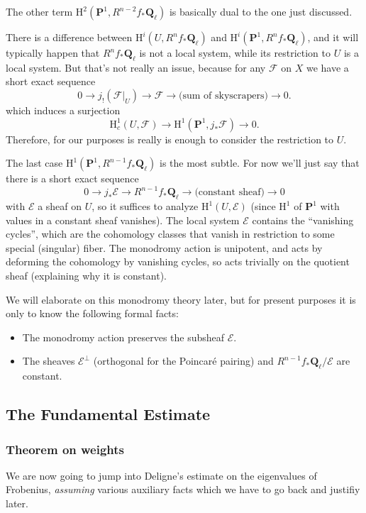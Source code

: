 \documentclass[letterpaper,11pt]{article}
\newcommand{\Q}{\mathbf{Q}}
\newcommand{\PS}{\mathbf{P}}
\newcommand{\Cal}[1]{\mathcal{#1}}
\newcommand{\mrm}[1]{\mathrm{#1}}
\begin{document}
The other term $\mrm{H}^2(\PS^1, R^{n-2} f_* \Q_{\ell})$ is basically dual to the one just discussed. 

\begin{remark}
There is a difference between $\mrm{H}^i(U, R^n f_* \Q_{\ell})$ and $\mrm{H}^i(\PS^1 ,R^n f_* \Q_{\ell})$, and it will typically happen that $R^n f_* \Q_{\ell}$ is not a local system, while its restriction to $U$ is a local system. But that's not really an issue, because for any $\Cal{F}$ on $X$ we have a short exact sequence 
\[
0 \rightarrow j_! (\Cal{F}|_U)  \rightarrow \Cal{F} \rightarrow \text{(sum of skyscrapers)} \rightarrow 0.
\]
which induces a surjection 
\[
\mrm{H}_c^1(U, \Cal{F}) \rightarrow \mrm{H}^1(\PS^1, j_* \Cal{F}) \rightarrow 0.
\]
Therefore, for our purposes is really is enough to consider the restriction to $U$. 
\end{remark}

The last case $\mrm{H}^1(\PS^1, R^{n-1} f_* \Q_{\ell})$ is the most subtle. For now we'll just say that there is a short exact sequence 
\begin{equation}\label{vanishing_sequence}
0 \rightarrow j_* \Cal{E} \rightarrow R^{n-1} f_* \Q_{\ell} \rightarrow \text{(constant sheaf)} \rightarrow 0
\end{equation}
with $\Cal{E}$ a sheaf on $U$, so it suffices to analyze $\mrm{H}^1(U,  \Cal{E})$ (since $\mrm{H}^1$ of $\PS^1$ with values in a constant sheaf vanishes). The local system $\Cal{E}$ contains the ``vanishing cycles'', which are the cohomology classes that vanish in restriction to some special (singular) fiber. The monodromy action is unipotent, and acts by deforming the cohomology by vanishing cycles, so acts trivially on the quotient sheaf (explaining why it is constant).

 We will elaborate on this monodromy theory later, but for present purposes it is only to know the following formal facts:
 \begin{itemize}
 \item The monodromy action preserves the subsheaf $\Cal{E}$.
 \item The sheaves $\Cal{E}^{\perp}$ (orthogonal for the Poincar\'{e} pairing) and $ R^{n-1} f_* \Q_{\ell} / \Cal{E}$ are constant.
\end{itemize}  


\subsection{The Fundamental Estimate}
\subsubsection{Theorem on weights}
We are now going to jump into Deligne's estimate on the eigenvalues of Frobenius, \emph{assuming} various auxiliary facts which we have to go back and justifiy later. 
\end{document}

